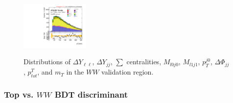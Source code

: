 \begin{figure}[!h]
{      \includegraphics[width=0.3\textwidth]{Pictures/run2-emme-CutVBFWWControl_CJV20-leadJetPt-lin.pdf}
  }\hfill
  \hfill
  \hfill
{\caption{Distributions of $\Delta Y_{\ell\ell}$, $\Delta Y_{jj}$, $\sum$ centralities, $M_{l0j0}$, $M_{l1j1}$, $p_T^{j0}$, $\Delta\Phi_{jj}$, $p^T_{tot}$, and $m_T$ in the $WW$ validation region.
\label{fig:WWCR3}}}
\end{figure}

\subsubsection{Top vs. $WW$ BDT discriminant}

